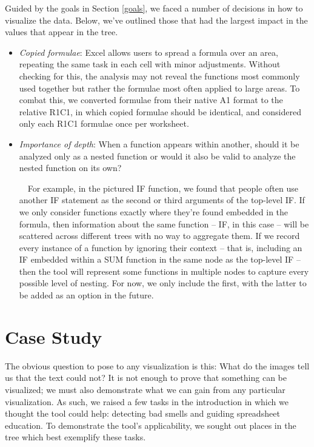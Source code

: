 \documentclass[conference]{IEEEtran}
\begin{document}
	Guided by the goals in Section \ref{goals}, we faced a number of decisions in
	how to visualize the data. Below, we've outlined those that had the largest
	impact in the values that appear in the tree. \begin{itemize}
		
		\item \textit{Copied formulae}: Excel allows users to spread a formula over an
		area, repeating the same task in each cell with minor adjustments. Without
		checking for this, the analysis may not reveal the functions most commonly
		used together but rather the formulae most often applied to large areas. To
		combat this, we converted formulae from their native A1 format to the relative
		R1C1, in which copied formulae should be identical, and considered only each
		R1C1 formulae once per worksheet.
		
		\item \textit{Importance of depth}: When a function appears within another,
		should it be analyzed only as a nested function or would it also be valid to
		analyze the nested function on its own? 
		
		\ \ For example, in the pictured IF function, we found that people often use
		another IF statement as the second or third arguments of the top-level IF. If
		we only consider functions exactly where they're found embedded in the
		formula, then information about the same function -- IF, in this case -- will
		be scattered across different trees with no way to aggregate them. If we
		record every instance of a function by ignoring their context -- that is,
		including an IF embedded within a SUM function in the same node as the
		top-level IF -- then the tool will represent some functions in multiple nodes
		to capture every possible level of nesting. For now, we only include the
		first, with the latter to be added as an option in the future.
		
	\end{itemize}
	
	\section{Case Study} The obvious question to pose to any visualization is this:
	What do the images tell us that the text could not? It is not enough to prove
	that something can be visualized; we must also demonstrate what we can gain
	from any particular visualization. As such, we raised a few tasks in the
	introduction in which we thought the tool could help: detecting bad smells and
	guiding spreadsheet education. To demonstrate the tool's applicability, we
	sought out places in the tree which best exemplify these tasks.
	
\end{document}
